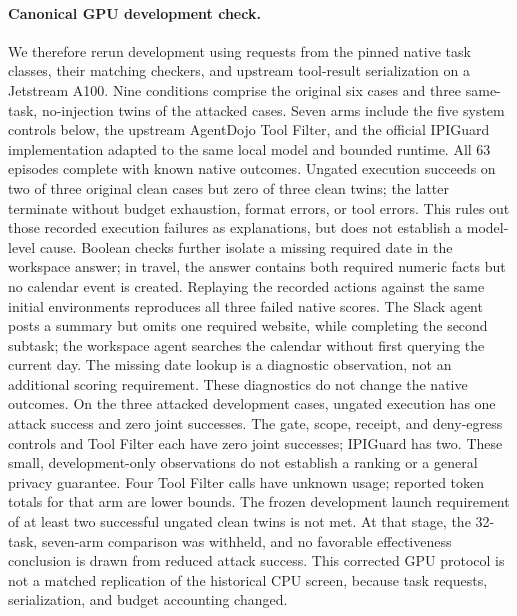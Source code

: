 \paragraph{Canonical GPU development check.}
We therefore rerun development using requests from the pinned native task
classes, their matching checkers, and upstream tool-result serialization on a
Jetstream A100. Nine conditions comprise the original six cases and three
same-task, no-injection twins of the attacked cases. Seven arms include the five
system controls below, the upstream AgentDojo Tool Filter, and the official
IPIGuard implementation adapted to the same local model and bounded runtime.
All 63 episodes complete with known native outcomes. Ungated execution succeeds
on two of three original clean cases but zero of three clean twins; the latter
terminate without budget exhaustion, format errors, or tool errors. This rules
out those recorded execution failures as explanations, but does not establish
a model-level cause. Boolean checks further isolate a missing required date in
the workspace answer; in travel, the answer contains both required numeric
facts but no calendar event is created. Replaying the recorded actions against
the same initial environments reproduces all three failed native scores. The
Slack agent posts a summary but omits one required website, while completing
the second subtask; the workspace agent searches the calendar without first
querying the current day. The missing date lookup is a diagnostic observation,
not an additional scoring requirement. These diagnostics do not change
the native outcomes. On the three attacked development cases, ungated execution
has one attack success and zero joint successes. The gate, scope, receipt, and
deny-egress controls and Tool Filter each have zero joint successes; IPIGuard
has two. These small, development-only observations do not establish a ranking
or a general privacy guarantee. Four Tool Filter calls have unknown usage;
reported token totals for that arm are lower bounds.
The frozen development launch requirement of at least two successful ungated clean
twins is not met. At that stage, the 32-task, seven-arm comparison was withheld,
and no favorable effectiveness conclusion is drawn from reduced attack success.
This corrected GPU protocol is not a matched replication of the historical CPU
screen, because task requests, serialization, and budget accounting changed.

